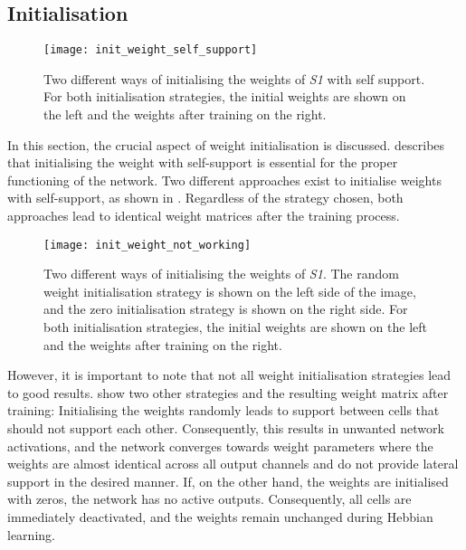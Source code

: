 \subsection{Initialisation}
\begin{figure}[h]
    \centering
    \texttt{[image: init\_weight\_self\_support]}
    \caption[Weight initialisation with self-support]{Two different ways of initialising the weights of \emph{S1} with self support. For both initialisation strategies, the initial weights are shown on the left and the weights after training on the right.}
\end{figure}

In this section, the crucial aspect of weight initialisation is discussed.
 describes that initialising the weight with self-support is essential for the proper functioning of the network.
Two different approaches exist to initialise weights with self-support, as shown in .
Regardless of the strategy chosen, both approaches lead to identical weight matrices after the training process.

\begin{figure}[h]
    \centering
    \texttt{[image: init\_weight\_not\_working]}
    \caption[Random weight initialisation]{Two different ways of initialising the weights of \emph{S1}. The random weight initialisation strategy is shown on the left side of the image, and the zero initialisation strategy is shown on the right side. For both initialisation strategies, the initial weights are shown on the left and the weights after training on the right.}
\end{figure}

However, it is important to note that not all weight initialisation strategies lead to good results. 
 show two other strategies and the resulting weight matrix after training:
Initialising the weights randomly leads to support between cells that should not support each other.
Consequently, this results in unwanted network activations, and the network converges towards weight parameters where the weights are almost identical across all output channels and do not provide lateral support in the desired manner.
If, on the other hand, the weights are initialised with zeros, the network has no active outputs. Consequently, all cells are immediately deactivated, and the weights remain unchanged during Hebbian learning.

